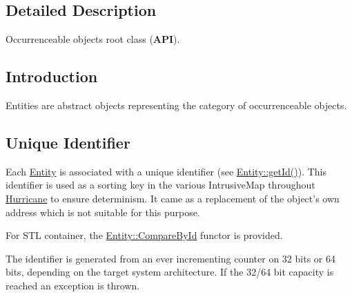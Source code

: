 \subsection{Detailed Description}
Occurrenceable objects root class ({\bfseries A\-P\-I}). 

\hypertarget{classHurricane_1_1Entity_secEntityIntro}{}\subsection{Introduction}\label{classHurricane_1_1Entity_secEntityIntro}
Entities are abstract objects representing the category of occurrenceable objects.\hypertarget{classHurricane_1_1Entity_secEntityId}{}\subsection{Unique Identifier}\label{classHurricane_1_1Entity_secEntityId}
Each \hyperlink{classHurricane_1_1Entity}{Entity} is associated with a unique identifier (see \hyperlink{classHurricane_1_1Entity_a8e63ad30c4ecb1612766ec14162bdbe5}{Entity\-::get\-Id()}). This identifier is used as a sorting key in the various Intrusive\-Map throughout \hyperlink{namespaceHurricane}{Hurricane} to ensure determinism. It came as a replacement of the object's own address which is not suitable for this purpose.

For S\-T\-L container, the \hyperlink{structHurricane_1_1Entity_1_1CompareById}{Entity\-::\-Compare\-By\-Id} functor is provided.

The identifier is generated from an ever incrementing counter on 32 bits or 64 bits, depending on the target system architecture. If the 32/64 bit capacity is reached an exception is thrown. 

